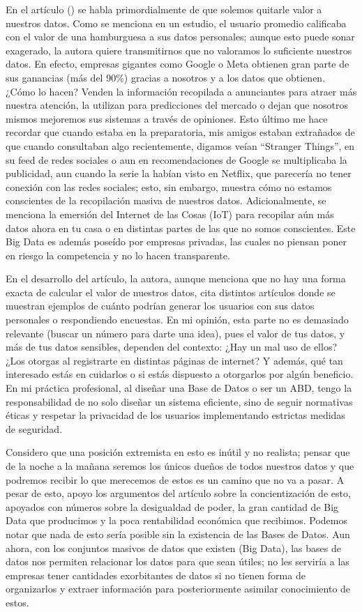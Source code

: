 En el artículo (\cite{becerril2018value}) se habla primordialmente de que solemos quitarle valor a nuestros datos. Como se menciona en un estudio, el usuario promedio calificaba con el valor de una hamburguesa a sus datos personales; aunque esto puede sonar exagerado, la autora quiere transmitirnos que no valoramos lo suficiente nuestros datos. En efecto, empresas gigantes como Google o Meta obtienen gran parte de sus ganancias (más del 90\%) gracias a nosotros y a los datos que obtienen. ¿Cómo lo hacen? Venden la información recopilada a anunciantes para atraer más nuestra atención, la utilizan para predicciones del mercado o dejan que nosotros mismos mejoremos sus sistemas a través de opiniones. Esto último me hace recordar que cuando estaba en la preparatoria, mis amigos estaban extrañados de que cuando consultaban algo recientemente, digamos veían ``Stranger Things'', en su feed de redes sociales o aun en recomendaciones de Google se multiplicaba la publicidad, aun cuando la serie la habían visto en Netflix, que parecería no tener conexión con las redes sociales; esto, sin embargo, muestra cómo no estamos conscientes de la recopilación masiva de nuestros datos. Adicionalmente, se menciona la emersión del Internet de las Cosas (IoT) para recopilar aún más datos ahora en tu casa o en distintas partes de las que no somos conscientes. Este Big Data es además poseído por empresas privadas, las cuales no piensan poner en riesgo la competencia y no lo hacen transparente.

En el desarrollo del artículo, la autora, aunque menciona que no hay una forma exacta de calcular el valor de nuestros datos, cita distintos artículos donde se muestran ejemplos de cuánto podrían generar los usuarios con sus datos personales o respondiendo encuestas. En mi opinión, esta parte no es demasiado relevante (buscar un número para darte una idea), pues el valor de tus datos, y más de tus datos sensibles, dependen del contexto: ¿Hay un mal uso de ellos? ¿Los otorgas al registrarte en distintas páginas de internet? Y además, qué tan interesado estás en cuidarlos o si estás dispuesto a otorgarlos por algún beneficio. En mi práctica profesional, al diseñar una Base de Datos o ser un ABD, tengo la responsabilidad de no solo diseñar un sistema eficiente, sino de seguir normativas éticas y respetar la privacidad de los usuarios implementando estrictas medidas de seguridad.

Considero que una posición extremista en esto es inútil y no realista; pensar que de la noche a la mañana seremos los únicos dueños de todos nuestros datos y que podremos recibir lo que merecemos de estos es un camino que no va a pasar. A pesar de esto, apoyo los argumentos del artículo sobre la concientización de esto, apoyados con números sobre la desigualdad de poder, la gran cantidad de Big Data que producimos y la poca rentabilidad económica que recibimos. Podemos notar que nada de esto sería posible sin la existencia de las Bases de Datos. Aun ahora, con los conjuntos masivos de datos que existen (Big Data), las bases de datos nos permiten relacionar los datos para que sean útiles; no les serviría a las empresas tener cantidades exorbitantes de datos si no tienen forma de organizarlos y extraer información para posteriormente asimilar conocimiento de estos.

